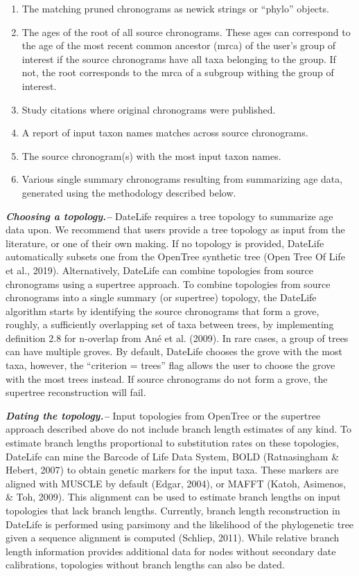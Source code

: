 \documentclass[
  english,
  man]{apa6}
\providecommand{\tightlist}{%
  \setlength{\itemsep}{0pt}\setlength{\parskip}{0pt}}
\begin{document}
\begin{enumerate}
\def\labelenumi{\arabic{enumi}.}
\tightlist
\item
  The matching pruned chronograms as newick strings or ``phylo'' objects.
\item
  The ages of the root of all source chronograms. These ages can correspond to the age of the most recent common ancestor (mrca) of the user's group of interest if the source chronograms have all taxa belonging to the group. If not, the root corresponds to the mrca of a subgroup withing the group of interest.
\item
  Study citations where original chronograms were published.
\item
  A report of input taxon names matches across source chronograms.
\item
  The source chronogram(s) with the most input taxon names.
\item
  Various single summary chronograms resulting from summarizing age data, generated using the methodology described below.
\end{enumerate}

\emph{\textbf{Choosing a topology.--}}
DateLife requires a tree topology to summarize age data upon.
We recommend that users provide a tree topology as input from the literature, or one of their own making. If no topology is provided, DateLife automatically subsets one from the OpenTree synthetic tree (Open Tree Of Life et al., 2019).
Alternatively, DateLife can combine topologies from source chronograms using a supertree approach.
To combine topologies from source chronograms into a single summary (or supertree) topology, the DateLife algorithm starts by identifying the source chronograms that form a grove, roughly, a sufficiently overlapping set of taxa between trees, by implementing definition 2.8 for n-overlap from Ané et al. (2009). In rare cases, a group of trees can have multiple groves. By default, DateLife chooses the grove with the most taxa, however, the ``criterion = trees'' flag allows the user to choose the grove with the most trees instead.
If source chronograms do not form a grove, the supertree reconstruction will fail.

\emph{\textbf{Dating the topology.--}}
Input topologies from OpenTree or the supertree approach described above do not include branch length estimates of any kind.
To estimate branch lengths proportional to substitution rates on these topologies, DateLife can mine the Barcode of Life Data System, BOLD (Ratnasingham \& Hebert, 2007) to obtain genetic markers for the input taxa.
These markers are aligned with MUSCLE by default (Edgar, 2004), or MAFFT (Katoh, Asimenos, \& Toh, 2009).
This alignment can be used to estimate branch lengths on input topologies that lack branch lengths.
Currently, branch length reconstruction in DateLife is performed using parsimony and the likelihood of the phylogenetic tree given a sequence alignment is computed (Schliep, 2011).
While relative branch length information provides additional data for nodes without secondary date calibrations, topologies without branch lengths can also be dated.
\end{document}
